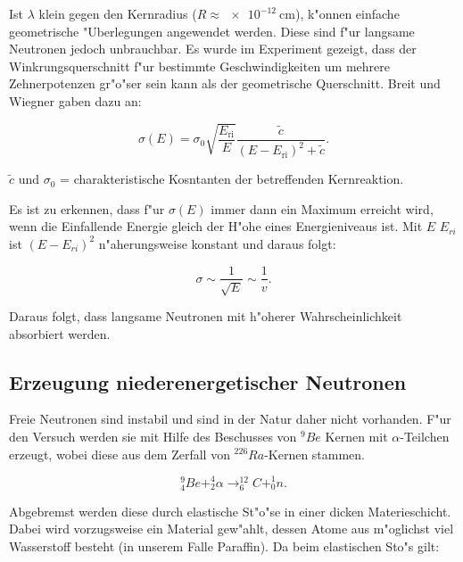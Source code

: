 			Ist $\lambda$ klein gegen den Kernradius ($R \approx \SI{e-12}{\centi\meter}$), k"onnen einfache geometrische "U\-ber\-le\-gung\-en angewendet werden.
			Diese sind f"ur langsame Neutronen jedoch unbrauchbar.
			Es wurde im Experiment gezeigt, dass der Winkrungsquerschnitt f"ur bestimmte Ge\-schwin\-dig\-kei\-ten um mehrere Zehnerpotenzen gr"o"ser sein kann als der geometrische Querschnitt.
			Breit und Wiegner gaben dazu an:

			\begin{equation*}
				\sigma(E) = \sigma_0 \sqrt{\frac{E_{\mathrm{ri}}}{E}} \frac{\tilde{c}}{(E - E_{\mathrm{ri}})^2 + \tilde{c}}.
			\end{equation*}

			\begin{center}
					\tiny{$\tilde{c}$ und $\sigma_0$ = charakteristische Kosntanten der betreffenden Kernreaktion}.
			\end{center}

			Es ist zu erkennen, dass f"ur $\sigma (E)$ immer dann ein Maximum erreicht wird, wenn die Einfallende Energie gleich der H"ohe eines Energieniveaus ist.
			Mit $E$ \ll $E_{ri}$ ist $(E - E_{ri})^2$ n"aherungsweise konstant und daraus folgt:

			\begin{equation}
				\sigma \sim \frac{1}{\sqrt{E}} \sim \frac{1}{v}.
			\end{equation}

			Daraus folgt, dass langsame Neutronen mit h"oherer Wahrscheinlichkeit absorbiert werden.

	\subsection{Erzeugung niederenergetischer Neutronen}
	\label{sub:erzeugung_niederenergetischer_neutronen}

		Freie Neutronen sind instabil und sind in der Natur daher nicht vorhanden.
		F"ur den Versuch werden sie mit Hilfe des Beschusses von $^9Be$ Kernen mit $\alpha$-Teilchen erzeugt, wobei diese aus dem Zerfall von $^{226}Ra$-Kernen stammen.

		\begin{equation*}
			^9_4Be + ^4_2\alpha \rightarrow ^{12}_6C +^1_0n.
		\end{equation*}

		Abgebremst werden diese durch elastische St"o"se in einer dicken Materieschicht.
		Dabei wird vorzugsweise ein Material gew"ahlt, dessen Atome aus m"oglichst viel Wasserstoff besteht (in unserem Falle Paraffin).
		Da beim elastischen Sto"s gilt:

